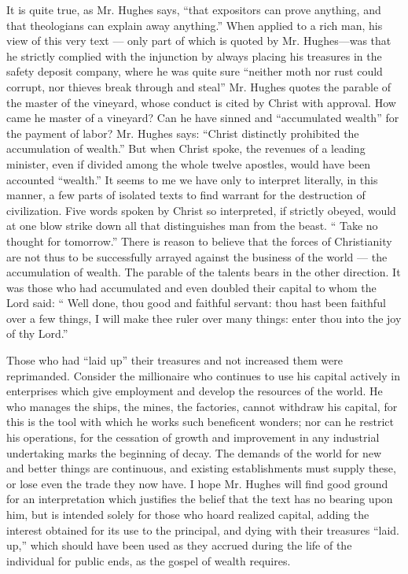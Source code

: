 \documentclass[11pt,openany]{book}
\begin{document}
It is quite true, as Mr. Hughes says, ``that expositors can prove anything, and that theologians can explain away anything.'' When applied to a rich man, his view of this very text --- only part of which is quoted by Mr. Hughes---was that he strictly complied with the injunction by always placing his treasures in the safety deposit company, where he was quite sure ``neither moth nor rust could corrupt, nor thieves break through and steal'' Mr. Hughes quotes the parable of the master of the vineyard, whose conduct is cited by Christ with approval. How came he master of a vineyard? Can he have sinned and ``accumulated wealth'' for the payment of labor? Mr. Hughes says: ``Christ distinctly prohibited the accumulation of wealth.'' But when Christ spoke, the revenues of a leading minister, even if divided among the whole twelve apostles, would have been accounted ``wealth.'' It seems to me we have only to interpret literally, in this manner, a few parts of isolated texts to find warrant for the destruction of civilization. Five words spoken by Christ so interpreted, if strictly obeyed, would at one blow strike down all that distinguishes man from the beast. `` Take no thought for tomorrow.'' There is reason to believe that the forces of Christianity are not thus to be successfully arrayed against the business of the world --- the accumulation of wealth. The parable of the talents bears in the other direction. It was those who had accumulated and even doubled their capital to whom the Lord said: `` Well done, thou good and faithful servant: thou hast been faithful over a few things, I will make thee ruler over many things: enter thou into the joy of thy Lord.''

Those who had ``laid up'' their treasures and not increased them were reprimanded. Consider the millionaire who continues to use his capital actively in enterprises which give employment and develop the resources of the world. He who manages the ships, the mines, the factories, cannot withdraw his capital, for this is the tool with which he works such beneficent wonders; nor can he restrict his operations, for the cessation of growth and improvement in any industrial undertaking marks the beginning of decay. The demands of the world for new and better things are continuous, and existing establishments must supply these, or lose even the trade they now have. I hope Mr. Hughes will find good ground for an interpretation which justifies the belief that the text has no bearing upon him, but is intended solely for those who hoard realized capital, adding the interest obtained for its use to the principal, and dying with their treasures ``laid. up,'' which should have been used as they accrued during the life of the individual for public ends, as the gospel of wealth requires.
\end{document}
